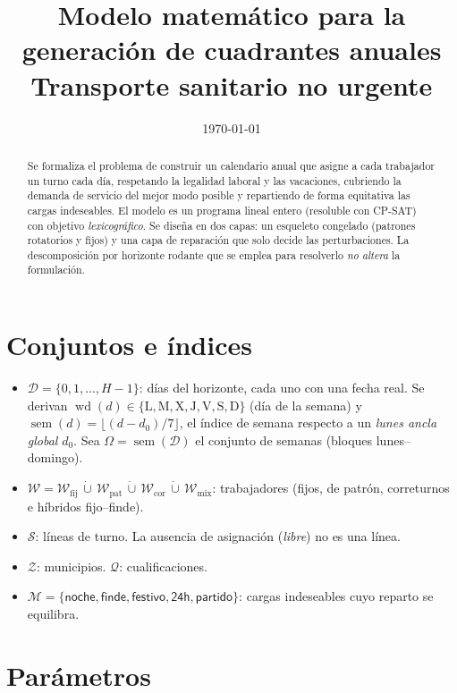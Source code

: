 \documentclass[11pt,a4paper]{article}
\title{\bfseries Modelo matemático para la generación de cuadrantes anuales\\[2pt]
\large Transporte sanitario no urgente}
\author{}
\date{\today}
\newcommand{\wkd}{\operatorname{wd}}
\newcommand{\sem}{\operatorname{sem}}
\newcommand{\Dom}{\mathcal{D}}
\newcommand{\Wk}{\mathcal{W}}
\newcommand{\Sk}{\mathcal{S}}
\newcommand{\Zk}{\mathcal{Z}}
\newcommand{\Qk}{\mathcal{Q}}
\newcommand{\Mk}{\mathcal{M}}
\newcommand{\Wfij}{\Wk_{\mathrm{fij}}}
\newcommand{\Wpat}{\Wk_{\mathrm{pat}}}
\newcommand{\Wcor}{\Wk_{\mathrm{cor}}}
\newcommand{\Wmix}{\Wk_{\mathrm{mix}}}
\theoremstyle{definition}
\begin{document}
\maketitle

\begin{abstract}
\noindent
Se formaliza el problema de construir un calendario anual que asigne a cada trabajador
un turno cada día, respetando la legalidad laboral y las vacaciones, cubriendo la demanda
de servicio del mejor modo posible y repartiendo de forma equitativa las cargas indeseables.
El modelo es un programa lineal entero (resoluble con \textsc{CP-SAT}) con objetivo
\emph{lexicográfico}. Se diseña en dos capas: un esqueleto congelado (patrones rotatorios y
fijos) y una capa de reparación que solo decide las perturbaciones. La descomposición por
horizonte rodante que se emplea para resolverlo \emph{no altera} la formulación.
\end{abstract}

\section{Conjuntos e índices}

\begin{itemize}[leftmargin=2.2em]
  \item $\Dom=\{0,1,\dots,H-1\}$: días del horizonte, cada uno con una fecha real. Se
    derivan $\wkd(d)\in\{\mathrm{L},\mathrm{M},\mathrm{X},\mathrm{J},\mathrm{V},\mathrm{S},\mathrm{D}\}$
    (día de la semana) y $\sem(d)=\big\lfloor (d-d_{0})/7\big\rfloor$, el índice de semana
    respecto a un \emph{lunes ancla global} $d_{0}$. Sea $\Omega=\sem(\Dom)$ el conjunto de
    semanas (bloques lunes--domingo).
  \item $\Wk=\Wfij\,\dot\cup\,\Wpat\,\dot\cup\,\Wcor\,\dot\cup\,\Wmix$: trabajadores
    (fijos, de patrón, correturnos e híbridos fijo--finde).
  \item $\Sk$: líneas de turno. La ausencia de asignación (\emph{libre}) no es una línea.
  \item $\Zk$: municipios. \quad $\Qk$: cualificaciones.
  \item $\Mk=\{\textsf{noche},\textsf{finde},\textsf{festivo},\textsf{24h},\textsf{partido}\}$:
    cargas indeseables cuyo reparto se equilibra.
\end{itemize}

\section{Parámetros}
\end{document}
